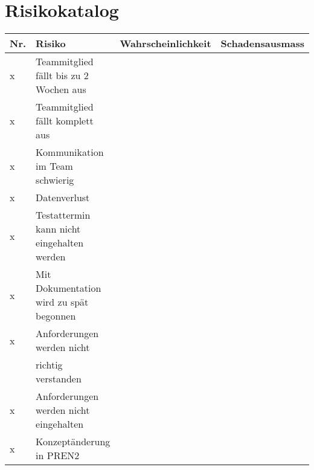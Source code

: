 \documentclass[a4paper]{report}
\begin{document}
	
\section{Risikokatalog}

\begin{tabular}{|l|l|l|l|}
	\hline 
	\textbf{Nr.} & \textbf{Risiko} & \textbf{Wahrscheinlichkeit} & \textbf{Schadensausmass} \\
	\hline
	x & Teammitglied fällt bis zu 2 Wochen aus & & \\
	\hline 
	x & Teammitglied fällt komplett aus & & \\
	\hline
	x & Kommunikation im Team schwierig & & \\
	\hline
	x & Datenverlust & & \\
	\hline 
	x & Testattermin kann nicht eingehalten werden & & \\
	\hline
	x & Mit Dokumentation wird zu spät begonnen & & \\
	\hline
	x & Anforderungen werden nicht & & \\
	& richtig verstanden & & \\
	\hline
	x & Anforderungen werden nicht eingehalten & & \\
	\hline
	x & Konzeptänderung in PREN2 & & \\
	\hline
\end{tabular}
\end{document}
